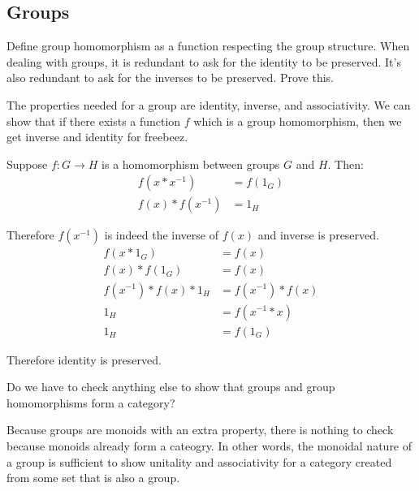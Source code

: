 \subsection{Groups}
\begin{ttta}
Define group homomorphism as a function respecting the group structure. When
dealing with groups, it is redundant to ask for the identity to be preserved.
It’s also redundant to ask for the inverses to be preserved. Prove this.
\end{ttta}
\begin{proofitem}
\item The properties needed for a group are identity, inverse, and
    associativity. We can show that if there exists a function $f$ which is a
    group homomorphism, then we get inverse and identity for freebeez.
\item Suppose $f: G \rightarrow H$ is a homomorphism between groups $G$ and $H$. Then:
\begin{align*}
    f(x\ast x^{-1}) &= f(1_G)\\
    f(x)\ast f(x^{-1}) &= 1_H
\end{align*}
\item Therefore $f(x^{-1})$ is indeed the inverse of $f(x)$ and inverse is
    preserved.
\begin{align*}
    f(x\ast 1_G) &= f(x)\\
    f(x)\ast f(1_G) &= f(x)\\
    f(x^{-1})\ast f(x)\ast 1_H &= f(x^{-1})\ast f(x)\\
    1_H &= f(x^{-1}\ast x)\\
    1_H &= f(1_G)
\end{align*}
\item Therefore identity is preserved.
\end{proofitem}

\begin{ttta}
Do we have to check anything else to show that groups and group homomorphisms form a category?
\end{ttta}
Because groups are monoids with an extra property, there is nothing to check
because monoids already form a cateogry. In other words, the monoidal nature of
a group is sufficient to show unitality and associativity for a category created
from some set that is also a group.


